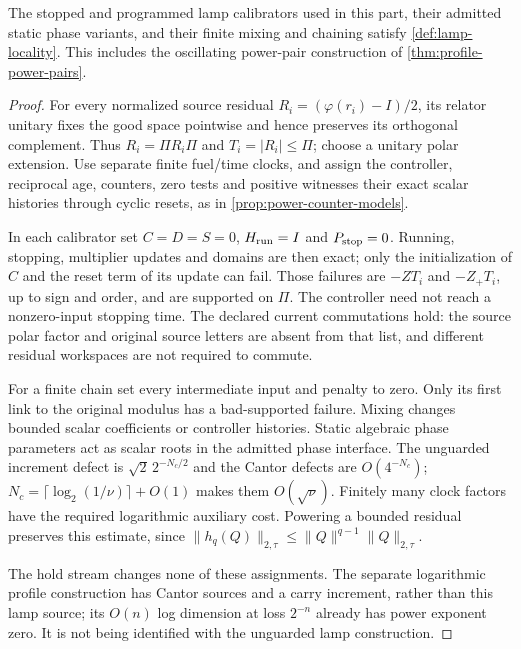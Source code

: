 \begin{lemma}\label{lem:local-calibrators}
The stopped and programmed lamp calibrators used in this part, their admitted static phase variants, and their finite mixing and chaining satisfy \cref{def:lamp-locality}. This includes the oscillating power-pair construction of \cref{thm:profile-power-pairs}.
\end{lemma}
\begin{proof}
For every normalized source residual $R_i=(\varphi(r_i)-I)/2$, its relator unitary fixes the good space pointwise and hence preserves its orthogonal complement. Thus $R_i=\Pi R_i\Pi$ and $T_i=|R_i|\le\Pi$; choose a unitary polar extension. Use separate finite fuel/time clocks, and assign the controller, reciprocal age, counters, zero tests and positive witnesses their exact scalar histories through cyclic resets, as in \cref{prop:power-counter-models}.

In each calibrator set $C=D=S=0$, $H_{\rm run}=I$ and $P_{\rm stop}=0$. Running, stopping, multiplier updates and domains are then exact; only the initialization of $C$ and the reset term of its update can fail. Those failures are $-ZT_i$ and $-Z_+T_i$, up to sign and order, and are supported on $\Pi$. The controller need not reach a nonzero-input stopping time. The declared current commutations hold: the source polar factor and original source letters are absent from that list, and different residual workspaces are not required to commute.

For a finite chain set every intermediate input and penalty to zero. Only its first link to the original modulus has a bad-supported failure. Mixing changes bounded scalar coefficients or controller histories. Static algebraic phase parameters act as scalar roots in the admitted phase interface. The unguarded increment defect is $\sqrt2\,2^{-N_c/2}$ and the Cantor defects are $O(4^{-N_c})$; $N_c=\lceil\log_2(1/\nu)\rceil+O(1)$ makes them $O(\sqrt\nu)$. Finitely many clock factors have the required logarithmic auxiliary cost. Powering a bounded residual preserves this estimate, since $\|h_q(Q)\|_{2,\tau}\le\|Q\|^{q-1}\|Q\|_{2,\tau}$.

The hold stream changes none of these assignments. The separate logarithmic profile construction has Cantor sources and a carry increment, rather than this lamp source; its $O(n)$ log dimension at loss $2^{-n}$ already has power exponent zero. It is not being identified with the unguarded lamp construction.
\end{proof}

